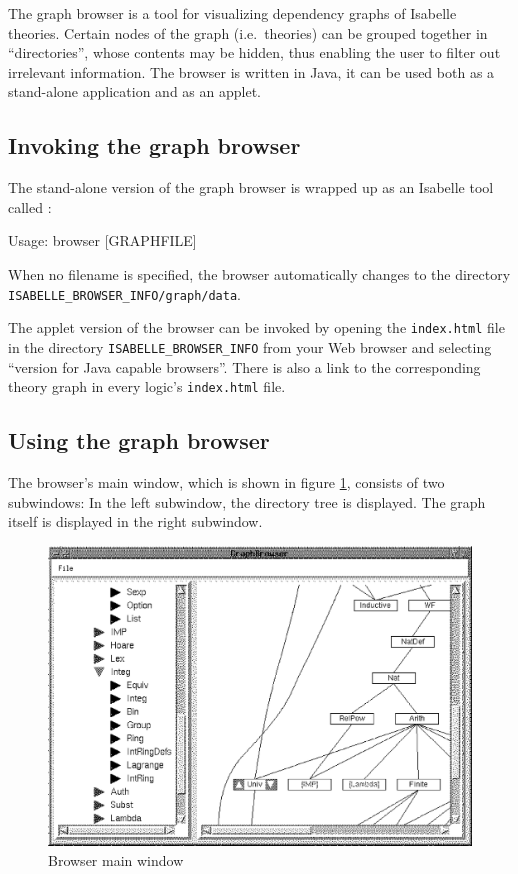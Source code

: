 The graph browser is a tool for visualizing dependency graphs of
Isabelle theories. Certain nodes of the graph (i.e.~theories) can be
grouped together in ``directories'', whose contents may be hidden,
thus enabling the user to filter out irrelevant information.  The
browser is written in Java, it can be used both as a stand-alone
application and as an applet.


\subsection{Invoking the graph browser}

The stand-alone version of the graph browser is wrapped up as an
Isabelle tool called :
\begin{ttbox}
Usage: browser [GRAPHFILE]
\end{ttbox}
When no filename is specified, the browser automatically changes to
the directory \texttt{ISABELLE_BROWSER_INFO/graph/data}.

\medskip The applet version of the browser can be invoked by opening
the {\tt index.html} file in the directory
\texttt{ISABELLE_BROWSER_INFO} from your Web browser and selecting
``version for Java capable browsers''.  There is also a link to the
corresponding theory graph in every logic's {\tt index.html} file.


\subsection{Using the graph browser}

The browser's main window, which is shown in figure
\ref{browserwindow}, consists of two subwindows: In the left
subwindow, the directory tree is displayed. The graph itself is
displayed in the right subwindow.
\begin{figure}[h]
  \includegraphics[width=\textwidth]{browser_screenshot.eps}
  \caption{\label{browserwindow} Browser main window}
\end{figure}


